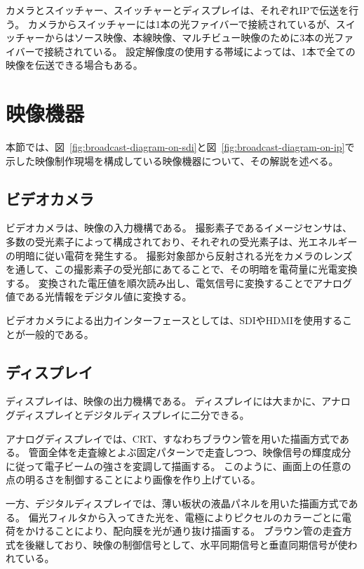 カメラとスイッチャー、スイッチャーとディスプレイは、それぞれIPで伝送を行う。
カメラからスイッチャーには1本の光ファイバーで接続されているが、スイッチャーからはソース映像、本線映像、マルチビュー映像のために3本の光ファイバーで接続されている。
設定解像度の使用する帯域によっては、1本で全ての映像を伝送できる場合もある。

\section{映像機器}
本節では、図~\ref{fig:broadcast-diagram-on-sdi}と図~\ref{fig:broadcast-diagram-on-ip}で示した映像制作現場を構成している映像機器について、その解説を述べる。

\subsection{ビデオカメラ}
\label{sec:camera}

ビデオカメラは、映像の入力機構である。
撮影素子であるイメージセンサは、多数の受光素子によって構成されており、それぞれの受光素子は、光エネルギーの明暗に従い電荷を発生する。
撮影対象部から反射される光をカメラのレンズを通して、この撮影素子の受光部にあてることで、その明暗を電荷量に光電変換する。
変換された電圧値を順次読み出し、電気信号に変換することでアナログ値である光情報をデジタル値に変換する。

ビデオカメラによる出力インターフェースとしては、SDIやHDMIを使用することが一般的である。

\subsection{ディスプレイ}
\label{sec:display}

ディスプレイは、映像の出力機構である。
ディスプレイには大まかに、アナログディスプレイとデジタルディスプレイに二分できる。

アナログディスプレイでは、CRT、すなわちブラウン管を用いた描画方式である。
管面全体を走査線とよぶ固定パターンで走査しつつ、映像信号の輝度成分に従って電子ビームの強さを変調して描画する。
このように、画面上の任意の点の明るさを制御することにより画像を作り上げている。

一方、デジタルディスプレイでは、薄い板状の液晶パネルを用いた描画方式である。
偏光フィルタから入ってきた光を、電極によりピクセルのカラーごとに電荷をかけることにより、配向膜を光が通り抜け描画する。
ブ゙ラウン管の走査方式を後継しており、映像の制御信号として、水平同期信号と垂直同期信号が使われている。

